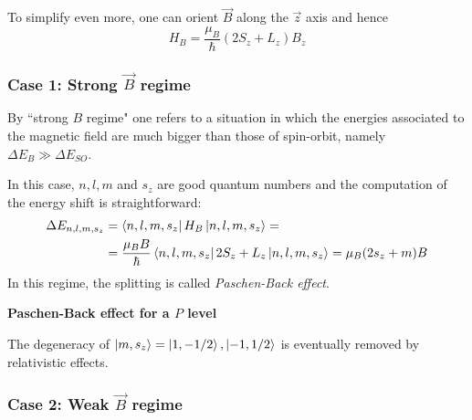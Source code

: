 To simplify even more, one can orient $\vec B$ along the $\vec{z}$ axis and hence 
\begin{equation*}
H_B = \frac{\mu_B}{\hbar} \left( 2S_z + L_z \right) B_z
\end{equation*} 


\subsubsection{Case 1: Strong $\vec B$ regime}

By ``strong $B$ regime" one refers to a situation in which the energies associated to the magnetic field are much bigger than those of spin-orbit, namely $\Delta E_B \gg \Delta E_{SO}$.

In this case, $n,l,m$ and $s_z$ are good quantum numbers and the computation of the energy shift is straightforward:
\begin{align*}
\Delta E_{n,l,m,s_z} &= \bra{n,l,m,s_z} H_B \ket{n,l,m,s_z} =\\
& = \frac{\mu_B B}{\hbar} \bra{n,l,m,s_z}  2S_z + L_z \ket{n,l,m,s_z} = \mu_B (2s_z + m)B
\end{align*}
In this regime, the splitting is called \textit{Paschen-Back effect}.

\begin{tcolorbox} 
\textbf{Paschen-Back effect for a $P$ level}
\begin{center}

\end{center}

The degeneracy of $\ket{m,s_z} = \ket{1, -1/2}, \ket{-1, 1/2}$ is eventually removed by relativistic effects.
\end{tcolorbox}

\subsubsection{Case 2: Weak $\vec B$ regime}

